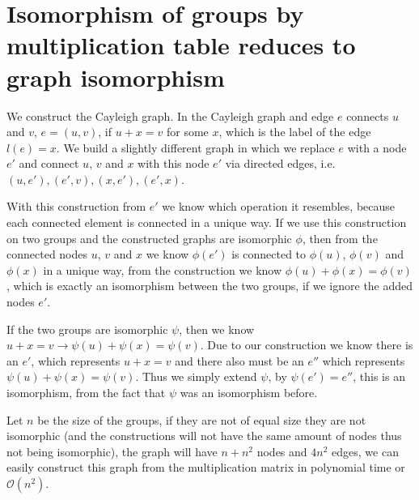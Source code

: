 \section{Isomorphism of groups by multiplication table reduces to graph isomorphism}

We construct the Cayleigh graph. In the Cayleigh graph and edge $e$ connects $u$ and $v$, $e=(u,v)$, if $u+x=v$ for some $x$, which is the label of the edge $l(e)=x$. We build a slightly different graph in which we replace $e$ with a node $e'$ and connect $u$, $v$ and $x$ with this node $e'$ via directed edges, i.e. $(u,e'),(e',v),(x,e'),(e',x)$. 

With this construction from $e'$ we know which operation it resembles, because each connected element is connected in a unique way. If we use this construction on two groups and the constructed graphs are isomorphic $\phi$, then from the connected nodes $u$, $v$ and $x$ we know $\phi(e')$ is connected to $\phi(u)$, $\phi(v)$ and $\phi(x)$ in a unique way, from the construction we know $\phi(u)+\phi(x)=\phi(v)$, which is exactly an isomorphism between the two groups, if we ignore the added nodes $e'$.

If the two groups are isomorphic $\psi$, then we know $u+x=v \rightarrow \psi(u)+\psi(x)=\psi(v)$. Due to our construction we know there is an $e'$, which represents $u+x=v$ and there also must be an $e''$ which represents $\psi(u)+\psi(x)=\psi(v)$. Thus we simply extend $\psi$, by $\psi(e')=e''$, this is an isomorphism, from the fact that $\psi$ was an isomorphism before.

Let $n$ be the size of the groups, if they are not of equal size they are not isomorphic (and the constructions will not have the same amount of nodes thus not being isomorphic), the graph will have $n+n^2$ nodes and $4 n^2$ edges, we can easily construct this graph from the multiplication matrix in polynomial time or $\mathcal{O}(n^2)$.